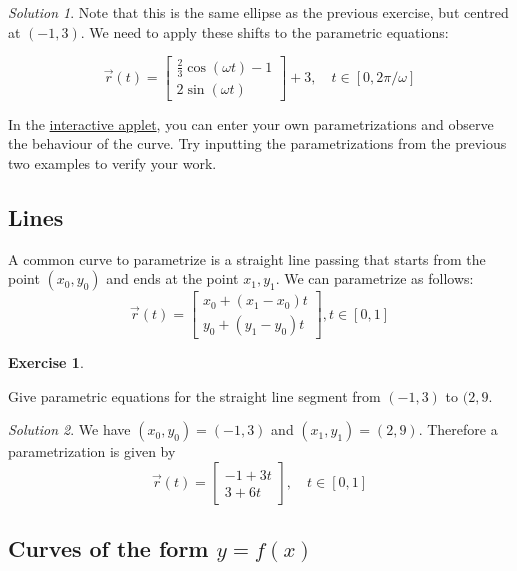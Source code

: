 \documentclass[
]{book}
\theoremstyle{definition}
\theoremstyle{definition}
\theoremstyle{definition}
\newtheorem{exercise}{Exercise}[chapter]
\theoremstyle{definition}
\theoremstyle{remark}
\newtheorem*{solution}{Solution}
\begin{document}
\begin{solution}

Note that this is the same ellipse as the previous exercise, but centred at \((-1, 3)\). We need to apply these shifts to the parametric equations:

\[\vec{r}(t)=\begin{bmatrix}\frac{2}{3}\cos(\omega t) -1 \\ 2\sin(\omega t)\end{bmatrix}+3, \quad t\in [0, 2\pi/\omega]\]

\end{solution}

In the \href{https://www.geogebra.org/m/mehspkdt}{interactive applet}, you can enter your own parametrizations and observe the behaviour of the curve. Try inputting the parametrizations from the previous two examples to verify your work.

\hypertarget{lines}{%
\subsection{Lines}\label{lines}}

A common curve to parametrize is a straight line passing that starts from the point \((x_0,y_0)\) and ends at the point \(x_1, y_1\). We can parametrize as follows: \[\vec{r}(t)=\begin{bmatrix}x_0+(x_1-x_0)t \\ y_0 + (y_1-y_0)t\end{bmatrix}, t\in[0,1]\]

\begin{exercise}
\protect\hypertarget{exr:unlabeled-div-38}{}\label{exr:unlabeled-div-38}

Give parametric equations for the straight line segment from \((-1,3)\) to \((2, 9\).

\end{exercise}

\begin{solution}

We have \((x_0, y_0)=(-1,3)\) and \((x_1, y_1)=(2,9)\). Therefore a parametrization is given by \[\vec{r}(t)=\begin{bmatrix}-1+3t \\  3+ 6t\end{bmatrix}, \quad t\in[0,1]\]

\end{solution}

\hypertarget{curves-of-the-form-yfx}{%
\subsection{\texorpdfstring{Curves of the form \(y=f(x)\)}{Curves of the form y=f(x)}}\label{curves-of-the-form-yfx}}
\end{document}
